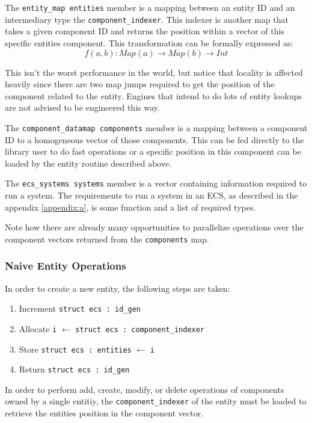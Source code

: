 The \texttt{entity\_map entities} member is a mapping between an entity ID and an intermediary type the \texttt{component\_indexer}. This indexer is another map that takes a given component ID and returns the position within a vector of this specific entities component. This transformation can be formally expressed as:
\begin{equation*}
    f(a, b) : Map(a) \rightarrow Map(b) \rightarrow Int
\end{equation*}

This isn't the worst performance in the world, but notice that locality is affected heavily since there are two map jumps required to get the position of the component related to the entity. Engines that intend to do lots of entity lookups are not advised to be engineered this way. 

The \texttt{component\_datamap components} member is a mapping between a component ID to a homogeneous vector of those components. This can be fed directly to the library user to do fast operations or a specific position in this component can be loaded by the entity routine described above.

The \texttt{ecs\_systems systems} member is a vector containing information required to run a system. The requirements to run a system in an ECS, as described in the appendix \ref{appendix:a}, is some function and a list of required types. 

Note how there are already many opportunities to parallelize operations over the component vectors returned from the \texttt{components} map.

\subsubsection{Naive Entity Operations}
In order to create a new entity, the following steps are taken:
\begin{enumerate}
    \item Increment \texttt{struct ecs : id\_gen}
    \item Allocate \texttt{i} $\leftarrow$ \texttt{struct ecs : component\_indexer} 
    \item Store \texttt{struct ecs : entities} $\leftarrow$ \texttt{i}
    \item Return \texttt{struct ecs : id\_gen}
\end{enumerate}

In order to perform add, create, modify, or delete operations of components owned by a single entitiy, the \texttt{component\_indexer} of the entity must be loaded to retrieve the entities position in the component vector.

